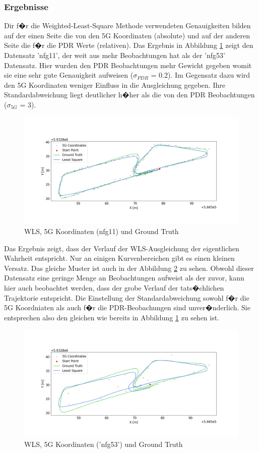 \subsubsection{Ergebnisse}
Dir f�r die Weighted-Least-Square Methode verwendeten Genauigkeiten bilden auf der einen Seite die von den 5G Koordinaten (absolute) und auf der anderen Seite die f�r die PDR Werte (relativen). Das Ergebnis in Abbildung \ref{fig:ls_11} zeigt den Datensatz 'nfg11', der weit aus mehr Beobachtungen hat als der 'nfg53' Datensatz. Hier wurden den PDR Beobachtungen mehr Gewicht gegeben womit sie eine sehr gute Genauigkeit aufweisen ($\sigma_{PDR}$ = 0.2). Im Gegensatz dazu wird den 5G Koordinaten weniger Einfluss in die Ausgleichung gegeben. Ihre Standardabweichung liegt deutlicher h�her als die von den PDR Beobachtungen ($\sigma_{5G}$ = 3).  
\begin{figure}[h!]
	\centering
	\includegraphics[width=0.8\linewidth]{source/images/ls_11}
	\caption{WLS, 5G Koordinaten (nfg11) und Ground Truth}
	\label{fig:ls_11}
\end{figure}
Das Ergebnis zeigt, dass der Verlauf der WLS-Ausgleichung der eigentlichen Wahrheit entspricht. Nur an einigen Kurvenbereichen gibt es einen kleinen Versatz. Das gleiche Muster ist auch in der Abbildung \ref{fig:ls_53} zu sehen. Obwohl dieser Datensatz eine geringe Menge an Beobachtungen aufweist als der zuvor, kann hier auch beobachtet werden, dass der grobe Verlauf der tats�chlichen Trajektorie entspricht. Die Einstellung der Standardabweichung sowohl f�r die 5G Koordniaten als auch f�r die PDR-Beobachungen sind unver�nderlich. Sie entsprechen also den gleichen wie bereits in Abbildung \ref{fig:ls_11} zu sehen ist. 
\begin{figure}[h!]
	\centering
	\includegraphics[width=0.8\linewidth]{source/images/ls_53}
	\caption{WLS, 5G Koordinaten ('nfg53') und Ground Truth}
	\label{fig:ls_53}
\end{figure}

